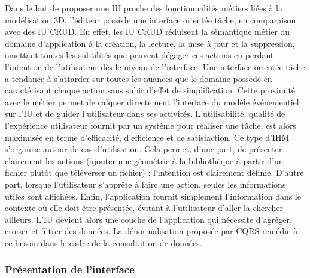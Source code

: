 Dans le but de proposer une \gls{IU} proche des fonctionnalités métiers liées à la 
modélisation \gls{3D}, l'éditeur possède une interface orientée \og tâche\fg{}, en 
comparaison avec des \gls{IU} \gls{CRUD}. En effet, les \gls{IU} \gls{CRUD} 
réduisent la sémantique métier du domaine d'application à la création, la lecture, la 
mise à jour et la suppression, omettant toutes les subtilités que peuvent dégager 
ces actions en perdant l'intention de l'utilisateur dès le niveau de l'interface. Une 
interface orientée tâche a tendance à s'attarder sur toutes les nuances que le 
domaine possède en caractérisant chaque action sans subir d'effet de 
simplification. Cette proximité avec le métier permet de calquer directement 
l'interface du modèle événementiel sur l'\gls{IU} et de guider l'utilisateur dans ses 
activités. L'utilisabilité, qualité de l'expérience utilisateur fournit par un système 
pour réaliser une tâche, est alors maximisée en terme d'efficacité, d'efficience et 
de satisfaction. 
Ce type d'\gls{IHM} s'organise autour de cas d'utilisation. Cela permet, 
d'une part, de présenter clairement les 
actions (\og ajouter une géométrie à la 
bibliothèque à partir d'un fichier\fg{} plutôt que \og téléverser un fichier\fg{}) : 
l'intention est clairement définie. D'autre part, lorsque l'utilisateur s'apprête à faire 
une action, seules les informations utiles sont affichées. Enfin, l'application fournit 
simplement l'information dans le contexte où elle doit être présentée, évitant à 
l'utilisateur d'aller la chercher ailleurs.
L'\gls{IU} devient alors une couche de l'application qui nécessite d'agréger, croiser 
et filtrer des données. La dénormalisation proposée par \gls{CQRS} remédie à ce 
besoin dans le cadre de la consultation de données. 


\subsubsection{Présentation de l'interface}


